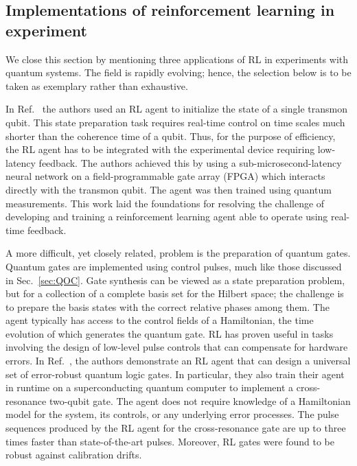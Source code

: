 \subsection{\label{subsec:RL_exp}Implementations of reinforcement learning in experiment}

We close this section by mentioning three applications of RL in experiments with quantum systems. The field is rapidly evolving; hence, the selection below is to be taken as exemplary rather than exhaustive. 


In Ref.~\cite{reuer2023realizing} the authors used an RL agent to initialize the state of a single transmon qubit. This state preparation task requires real-time control on time scales much shorter than the coherence time of a qubit. Thus, for the purpose of efficiency, the RL agent has to be integrated with the experimental device requiring low-latency feedback. The authors achieved this by using a sub-microsecond-latency neural network on a field-programmable gate array (FPGA) which interacts directly with the transmon qubit. The agent was then trained using quantum measurements. 
This work laid the foundations for resolving the challenge of developing and training a reinforcement learning agent able to operate using real-time feedback.





A more difficult, yet closely related, problem is the preparation of quantum gates. Quantum gates are implemented using control pulses, much like those discussed in Sec.~\ref{sec:QOC}. Gate synthesis can be viewed as a state preparation problem, but for a collection of a complete basis set for the Hilbert space; the challenge is to prepare the basis states with the correct relative phases among them. The agent typically has access to the control fields of a Hamiltonian, the time evolution of which generates the quantum gate.
RL has proven useful in tasks involving the design of low-level pulse controls that can compensate for hardware errors. In Ref.~\cite{baum2021experimental}, the authors demonstrate an RL agent that can design a universal set of error-robust quantum logic gates. In particular, they also train their agent in runtime on a superconducting quantum computer to implement a cross-resonance two-qubit gate. The agent does not require knowledge of a Hamiltonian model for the system, its controls, or any underlying error processes. The pulse sequences produced by the RL agent for the cross-resonance gate are up to three times faster than state-of-the-art pulses. Moreover, RL gates were found to be robust against calibration drifts.




